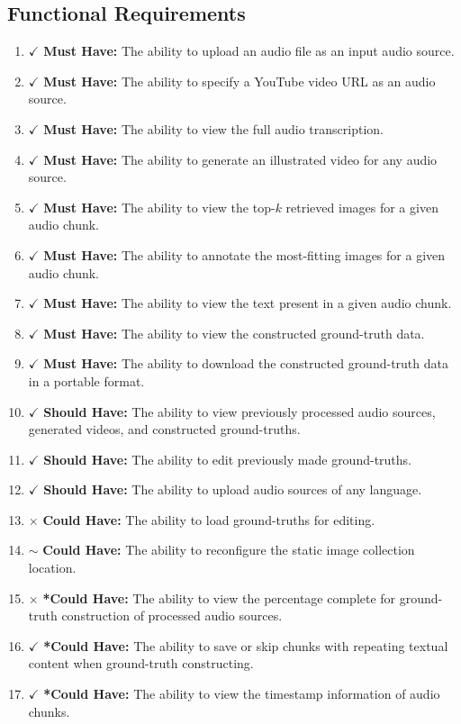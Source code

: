 \documentclass{l4proj}
\begin{document}
\subsection{Functional Requirements}
\begin{enumerate}
    \item {\color{forestgreen} $\checkmark$ \textbf{Must Have:} The ability to upload an audio file as an input audio source.}
    \item {\color{forestgreen} $\checkmark$ \textbf{Must Have:} The ability to specify a YouTube video URL as an audio source.}
    \item {\color{forestgreen} $\checkmark$ \textbf{Must Have:} The ability to view the full audio transcription.}
    \item {\color{forestgreen} $\checkmark$ \textbf{Must Have:} The ability to generate an illustrated video for any audio source.}
    \item {\color{forestgreen} $\checkmark$ \textbf{Must Have:} The ability to view the top-$k$ retrieved images for a given audio chunk.}
    \item {\color{forestgreen} $\checkmark$ \textbf{Must Have:} The ability to annotate the most-fitting images for a given audio chunk.}
    \item {\color{forestgreen} $\checkmark$ \textbf{Must Have:} The ability to view the text present in a given audio chunk.}
    \item {\color{forestgreen} $\checkmark$ \textbf{Must Have:} The ability to view the constructed ground-truth data.}
    \item {\color{forestgreen} $\checkmark$ \textbf{Must Have:} The ability to download the constructed ground-truth data in a portable format.}
    \item {\color{forestgreen} $\checkmark$ \textbf{Should Have:} The ability to view previously processed audio sources, generated videos, and constructed ground-truths.}
    \item {\color{forestgreen} $\checkmark$ \textbf{Should Have:} The ability to edit previously made ground-truths.}
    \item {\color{forestgreen} $\checkmark$ \textbf{Should Have:} The ability to upload audio sources of any language.}
    \item \label{reqs:13} {\color{brickred} $\times$ \textbf{Could Have:} The ability to load ground-truths for editing.}
    \item \label{reqs:14} {\color{golden} $\sim$ \textbf{Could Have:} The ability to reconfigure the static image collection location.}
    \item \label{reqs:15} {\color{brickred} $\times$ \textbf{*Could Have:} The ability to view the percentage complete for ground-truth construction of processed audio sources.}
    \item {\color{forestgreen} $\checkmark$ \textbf{*Could Have:} The ability to save or skip chunks with repeating textual content when ground-truth constructing.}
    \item {\color{forestgreen} $\checkmark$ \textbf{*Could Have:} The ability to view the timestamp information of audio chunks.}
\end{enumerate}
\end{document}
